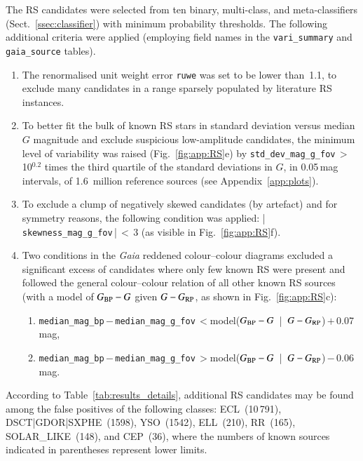 \documentclass[longauth]{aa}
\def\gaia{\textit{Gaia}\xspace}
\def\g{$G$\xspace}
\def\bpg{\mbox{$G_{\rm BP}-G$}\xspace}
\def\grp{\mbox{$G-G_{\rm RP}$}\xspace}
\begin{document}
The RS candidates were selected from ten binary, multi-class, and meta-classifiers (Sect.~\ref{ssec:classifier}) with minimum probability thresholds. The following additional criteria were applied (employing field names in the \texttt{vari\_summary} and \texttt{gaia\_source} tables).
\begin{enumerate}
    \item The renormalised unit weight error \texttt{ruwe} was set to be lower than~1.1, to exclude many candidates in a range sparsely populated by literature RS instances.
    \item To better fit the bulk of known RS stars in standard deviation versus median \g magnitude and exclude suspicious low-amplitude candidates, the minimum level of variability was raised (Fig.~\ref{fig:app:RS}e) by \texttt{std\_dev\_mag\_g\_fov}\,$>$\,10$^{0.2}$ times the third quartile of the standard deviations in \g, in 0.05\,mag intervals, of 1.6~million reference sources (see Appendix~\ref{app:plots}).
    \item To exclude a clump of negatively skewed candidates (by artefact) and for symmetry reasons, the following condition was applied:  |\,\texttt{skewness\_mag\_g\_fov}\,|\,$<$\,3 (as visible in Fig.~\ref{fig:app:RS}f).
    \item Two conditions in the \gaia reddened colour--colour diagrams excluded a significant excess of candidates where only few known RS were present and followed  the general colour--colour relation of all other known RS sources (with a model of \bpg given \grp, as shown in Fig.~\ref{fig:app:RS}c): 
    \begin{enumerate}
        \item \texttt{median\_mag\_bp}\,$-$\,\texttt{median\_mag\_g\_fov}\,$<$\break model(\bpg~|~\grp)\,$+$\,0.07\,mag,
        \item \texttt{median\_mag\_bp}\,$-$\,\texttt{median\_mag\_g\_fov}\,$>$\break model(\bpg~|~\grp)\,$-$\,0.06\,mag. 
    \end{enumerate}\end{enumerate}

According to Table~\ref{tab:results_details}, additional RS candidates may be found among the false positives of the following classes: ECL~(10\,791),  DSCT|GDOR|SXPHE~(1598), YSO~(1542), ELL~(210), RR~(165), SOLAR\_LIKE~(148), and CEP~(36),  where the numbers of known sources indicated in parentheses represent lower limits.


\end{document}
